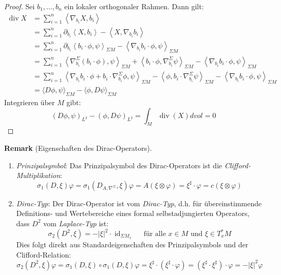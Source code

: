 \documentclass[10pt, letterpaper]{article}
\newcommand{\CustomHeading}[3]{%
  \par\medskip\noindent%
  \textbf{#1 #2} \textnormal{(#3)}.\enskip%
}
\newenvironment{REM}[2]{\CustomHeading{Remark}{#1}{#2}}{}
\begin{document}
\begin{proof}
Sei $b_1, \ldots, b_n$ ein lokaler orthogonaler Rahmen. Dann gilt:
$$
  \begin{aligned}
  \operatorname{div} X & =\sum_{i=1}^n\left\langle\nabla_{b_i} X, b_i\right\rangle \\
  & =\sum_{i=1}^n \partial_{b_i}\left\langle X, b_i\right\rangle-\left\langle X, \nabla_{b_i} b_i\right\rangle \\
  & =\sum_{i=1}^n \partial_{b_i}\left\langle b_i \cdot \phi, \psi\right\rangle_{\Sigma M}-\left\langle\nabla_{b_i} b_i \cdot \phi, \psi\right\rangle_{\Sigma M} \\
  & = \sum_{i=1}^n\left\langle\nabla_{b_i}^{\Sigma}\left(b_i \cdot \phi\right), \psi\right\rangle_{\Sigma M}+\left\langle b_i \cdot \phi, \nabla_{b_i}^{\Sigma} \psi\right\rangle_{\Sigma M}-\left\langle\nabla_{b_i} b_i \cdot \phi, \psi\right\rangle_{\Sigma M}\\
  & = \sum_{i=1}^n\left\langle\nabla_{b_i} b_i \cdot \phi+b_i \cdot \nabla_{b_i}^{\Sigma} \phi, \psi\right\rangle_{\Sigma M}-\left\langle\phi, b_i \cdot \nabla_{b_i}^{\Sigma} \psi\right\rangle_{\Sigma M}-\left\langle\nabla_{b_i} b_i \cdot \phi, \psi\right\rangle_{\Sigma M} \\ 
  & = \langle D \phi, \psi\rangle_{\Sigma M}-\langle\phi, D \psi\rangle_{\Sigma M}
  \end{aligned}
  $$
  Integrieren über $M$ gibt:
  $$
  (D \phi, \psi)_{L^2}-(\phi, D \psi)_{L^2}=\int_M \operatorname{div}(X) d v o l=0
  $$
\end{proof}

\begin{REM}{}{Eigenschaften des Dirac-Operators}
  \begin{enumerate}
    \item \emph{Prinzipalsymbol}: Das Prinzipalsymbol des Dirac-Operators ist die \emph{Clifford-Multiplikation}:
    $$\sigma_1(D, \xi) \varphi=\sigma_1\left(D_{A, \nabla^{\Sigma}}, \xi\right) \varphi = A(\xi \otimes \varphi)=\xi^{\sharp} \cdot \varphi=c(\xi\otimes \varphi)$$
    \item \emph{Dirac-Typ}: Der Dirac-Operator ist vom \emph{Dirac-Typ}, d.h. für übereinstimmende Definitions- und Wertebereiche eines formal selbstadjungierten Operators, dass $D^2$ vom \emph{Laplace-Typ} ist:
    $$\sigma_2(D^2, \xi)=-|\xi|^2 \cdot \operatorname{id}_{\Sigma M_x} \quad \text{ für alle } x \in M \text{ und } \xi \in T_x^* M$$
    Dies folgt direkt aus Standardeigenschaften des Prinzipalsymbols und der Clifford-Relation:
    $$\sigma_2(D^2,\xi)\varphi=\sigma_1(D,\xi)\circ\sigma_1(D,\xi)\varphi=\xi^\sharp\cdot(\xi^\sharp\cdot \varphi)=(\xi^\sharp\cdot\xi^\sharp)\cdot \varphi=-|\xi|^2\varphi$$


    
    
  \end{enumerate}
\end{REM}
\end{document}
